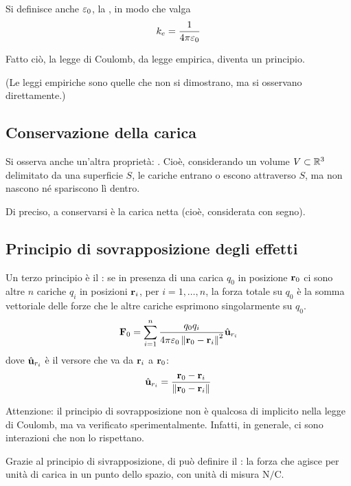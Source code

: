 Si definisce anche $\varepsilon_0$, la , in modo che valga
\begin{equation}
    k_e = \frac{1}{4\pi \varepsilon_0}
\end{equation}

Fatto ciò, la legge di Coulomb, da legge empirica, diventa un principio.

(Le leggi empiriche sono quelle che non si dimostrano, ma si osservano direttamente.)

\subsection{Conservazione della carica}

Si osserva anche un'altra proprietà: .
Cioè, considerando un volume $V \subset \mathbb{R}^3$ delimitato da una superficie $S$, le cariche entrano o escono attraverso $S$, ma non nascono né spariscono lì dentro.

Di preciso, a conservarsi è la carica netta (cioè, considerata con segno).

\subsection{Principio di sovrapposizione degli effetti}

Un terzo principio è il : se in presenza di una carica $q_0$ in posizione $\mathbf{r}_0$ ci sono altre $n$ cariche $q_i$ in posizioni $\mathbf{r}_i$, per $i = 1, \ldots, n$, la forza totale su $q_0$ è la somma vettoriale delle forze che le altre cariche esprimono singolarmente su $q_0$.
\begin{equation}
    \mathbf{F}_0 = \sum_{i=1}^n \frac{q_0 q_i}{4 \pi \varepsilon_0 \left\lVert \mathbf{r}_0 - \mathbf{r}_i \right\rVert^2} \hat{\mathbf{u}}_{r_i}
\end{equation}
dove $\hat{\mathbf{u}}_{r_i}$ è il versore che va da $\mathbf{r}_i$ a $\mathbf{r}_0$:
\begin{equation}
    \hat{\mathbf{u}}_{r_i} = \frac{\mathbf{r}_0 - \mathbf{r}_i}{\left\lVert \mathbf{r}_0 - \mathbf{r}_i \right\rVert}
\end{equation}

Attenzione: il principio di sovrapposizione non è qualcosa di implicito nella legge di Coulomb, ma va verificato sperimentalmente.
Infatti, in generale, ci sono interazioni che non lo rispettano.

Grazie al principio di sivrapposizione, di può definire il : la forza che agisce per unità di carica in un punto dello spazio, con unità di misura $\unit{\newton\per\coulomb}$.

